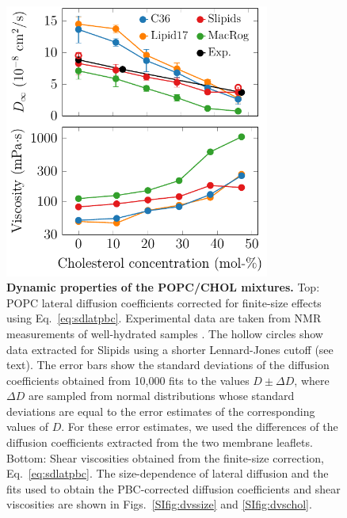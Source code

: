 \documentclass[journal=jctcce]{achemso}
\begin{document}
\begin{figure}[htb!]
  \centering
  \includegraphics[width=8.7cm]{../FIGS/dynamics.pdf}
  \caption{\label{fig:dynamics}%
  \textbf{Dynamic properties of the POPC/CHOL mixtures.}
  Top: POPC lateral diffusion coefficients corrected for finite-size effects using Eq.~\eqref{eq:sdlatpbc}. Experimental data are taken from NMR measurements of well-hydrated samples \cite{filippov2003influence,filippov2003effect}. The hollow circles show data extracted for Slipids using a shorter Lennard-Jones cutoff (see text). The error bars show the standard deviations of the diffusion coefficients obtained from 10,000 fits to the values $D\pm\Delta D$, where $\Delta D$ are sampled from normal distributions whose standard deviations are equal to the error estimates of the corresponding values of $D$. For these error estimates, we used the differences of the diffusion coefficients extracted from the two membrane leaflets.
  Bottom: Shear viscosities obtained from the finite-size correction, Eq.~\eqref{eq:sdlatpbc}.
  The size-dependence of lateral diffusion and the fits used to obtain the PBC-corrected diffusion coefficients and shear viscosities are shown in Figs.~\ref{SIfig:dvssize} and \ref{SIfig:dvschol}.
  }
\end{figure}
\end{document}
